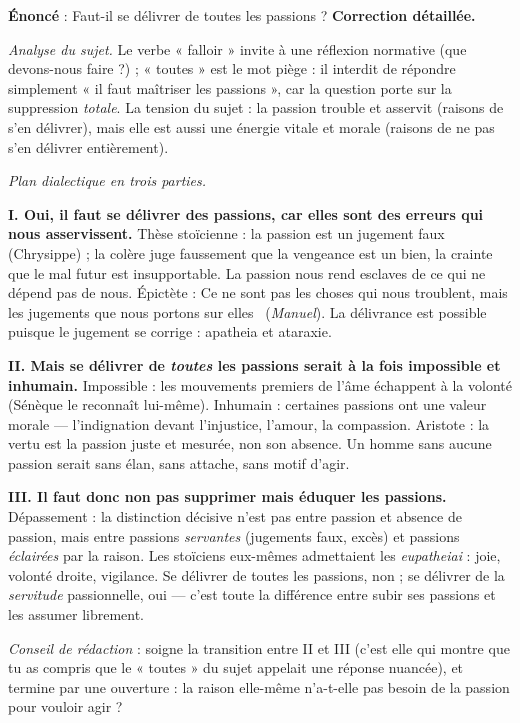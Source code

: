 \documentclass[11pt]{article}
\begin{document}
\begin{exoresolu}
\textbf{Énoncé} : Faut-il se délivrer de toutes les passions ?
\tcblower
\textbf{Correction détaillée.}

\emph{Analyse du sujet.} Le verbe « falloir » invite à une réflexion normative (que devons-nous faire ?) ; « toutes » est le mot piège : il interdit de répondre simplement « il faut maîtriser les passions », car la question porte sur la suppression \emph{totale}. La tension du sujet : la passion trouble et asservit (raisons de s'en délivrer), mais elle est aussi une énergie vitale et morale (raisons de ne pas s'en délivrer entièrement).

\emph{Plan dialectique en trois parties.}

\textbf{I. Oui, il faut se délivrer des passions, car elles sont des erreurs qui nous asservissent.} Thèse stoïcienne : la passion est un jugement faux (Chrysippe) ; la colère juge faussement que la vengeance est un bien, la crainte que le mal futur est insupportable. La passion nous rend esclaves de ce qui ne dépend pas de nous. Épictète : \guillemotleft Ce ne sont pas les choses qui nous troublent, mais les jugements que nous portons sur elles \guillemotright\ (\emph{Manuel}). La délivrance est possible puisque le jugement se corrige : apatheia et ataraxie.

\textbf{II. Mais se délivrer de \emph{toutes} les passions serait à la fois impossible et inhumain.} Impossible : les mouvements premiers de l'âme échappent à la volonté (Sénèque le reconnaît lui-même). Inhumain : certaines passions ont une valeur morale — l'indignation devant l'injustice, l'amour, la compassion. Aristote : la vertu est la passion juste et mesurée, non son absence. Un homme sans aucune passion serait sans élan, sans attache, sans motif d'agir.

\textbf{III. Il faut donc non pas supprimer mais éduquer les passions.} Dépassement : la distinction décisive n'est pas entre passion et absence de passion, mais entre passions \emph{servantes} (jugements faux, excès) et passions \emph{éclairées} par la raison. Les stoïciens eux-mêmes admettaient les \emph{eupatheiai} : joie, volonté droite, vigilance. Se délivrer de toutes les passions, non ; se délivrer de la \emph{servitude} passionnelle, oui — c'est toute la différence entre subir ses passions et les assumer librement.

\emph{Conseil de rédaction} : soigne la transition entre II et III (c'est elle qui montre que tu as compris que le « toutes » du sujet appelait une réponse nuancée), et termine par une ouverture : la raison elle-même n'a-t-elle pas besoin de la passion pour vouloir agir ?
\end{exoresolu}
\end{document}
